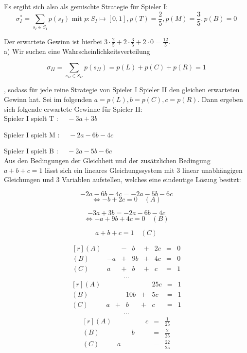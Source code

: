 \documentclass{scrartcl}
\begin{document}
Es ergibt sich also als gemischte Strategie für Spieler I:
\[
\sigma^*_I = \sum_{s_I \in S_I} p(s_I) \text{ mit } p : S_I \mapsto [0, 1], p(T) = 
\frac{2}{5}, p(M) = \frac{3}{5}, p(B) = 0
\]

Der erwartete Gewinn ist hierbei $3 \cdot \frac{2}{5} + 2 \cdot \frac{3}{5} + 2 \cdot
0 = \frac{12}{5}$. \\

a) Wir suchen eine Wahrscheinlichkeitsverteilung 

\[
\sigma_{II} = \sum_{s_{II} \in S_{II}} p(s_{II}) = p(L) + p(C) + p(R) = 1
\]

, sodass für jede reine Strategie von Spieler I Spieler II den gleichen erwarteten Gewinn
hat. Sei im folgenden $a = p(L), b = p(C), c = p(R)$. Dann ergeben sich folgende erwartete
Gewinne für Spieler II: \\

Spieler I spielt T : $\quad -3a + 3b$

Spieler I spielt M : $\quad -2a - 6b - 4c$

Spieler I spielt B : $\quad -2a - 5b - 6c$ \\

Aus den Bedingungen der Gleichheit und der zusätzlichen Bedingung $a+b+c = 1$ lässt sich ein
lineares Gleichungssystem mit 3 linear unabhängigen Gleichungen und 3 Variablen aufstellen,
welches eine eindeutige Lösung besitzt:

\[
-2a - 6b - 4c = -2a - 5b - 6c
\]
\[
\Leftrightarrow -b + 2c = 0 \quad (A)
\]

\[
-3a + 3b = -2a - 6b - 4c
\]
\[
\Leftrightarrow -a + 9b + 4c = 0 \quad (B)
\]

\[
a + b + c = 1 \quad (C)
\]

\[
\begin{matrix*}[r]
  (A) & & -&b & +&2c & = & 0 \\
  (B) & -a & +&9b & +&4c & = & 0 \\
  (C) & a & +&b & +&c & = & 1 \\
\end{matrix*}
\] \[ \cdots \] \[
\begin{matrix*}[r]
  (A) & & & & & 25c & = & 1 \\
  (B) & & &10b & +& 5c & = & 1 \\
  (C) & a & +&b & +&c & = & 1 \\
\end{matrix*}
\] \[ \cdots \] \[
\begin{matrix*}[r]
  (A) & & & & & c & = & \frac{1}{25} \\
  (B) & & & b & & & = & \frac{2}{25} \\
  (C) & a & & & & & = & \frac{22}{25} \\
\end{matrix*}
\]
\end{document}
